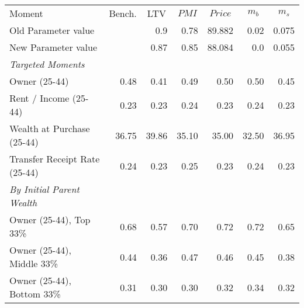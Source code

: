 \begin{tabular}{l rrrrrr}
\toprule
Moment & \multicolumn{1}{c}{Bench.} & \multicolumn{1}{c}{LTV} & \multicolumn{1}{c}{$PMI$} & \multicolumn{1}{c}{$Price$} & \multicolumn{1}{c}{$m_b$ } & \multicolumn{1}{c}{$m_s$}\\
\; Old Parameter value &  & 0.9 & 0.78 & 89.882 & 0.02 & 0.075 \\ 
\; New Parameter value &  & 0.87 & 0.85 & 88.084 & 0.0 & 0.055 \\ 
\midrule
\textit{Targeted Moments} &  &  &  &  &  & \\
\;Owner (25-44) & 0.48 & 0.41 & 0.49 & 0.50 & 0.50 & 0.45\\
\;Rent / Income (25-44) & 0.23 & 0.23 & 0.24 & 0.23 & 0.24 & 0.23\\
\;Wealth at Purchase (25-44) & 36.75 & 39.86 & 35.10 & 35.00 & 32.50 & 36.95\\
\;Transfer Receipt Rate (25-44) & 0.24 & 0.23 & 0.25 & 0.23 & 0.24 & 0.23\\
\textit{By Initial Parent Wealth} &  &  &  &  &  & \\
\;Owner (25-44), Top 33\% & 0.68 & 0.57 & 0.70 & 0.72 & 0.72 & 0.65\\
\;Owner (25-44), Middle 33\% & 0.44 & 0.36 & 0.47 & 0.46 & 0.45 & 0.38\\
\;Owner (25-44), Bottom 33\% & 0.31 & 0.30 & 0.30 & 0.32 & 0.34 & 0.32\\
\bottomrule
\end{tabular}
